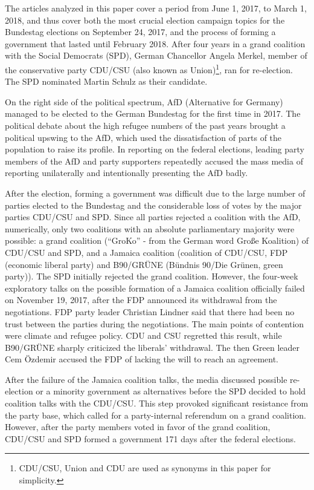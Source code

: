 \documentclass[
  12pt,
]{article}
\begin{document}
The articles analyzed in this paper cover a period from June 1, 2017, to
March 1, 2018, and thus cover both the most crucial election campaign
topics for the Bundestag elections on September 24, 2017, and the
process of forming a government that lasted until February 2018. After
four years in a grand coalition with the Social Democrats (SPD), German
Chancellor Angela Merkel, member of the conservative party CDU/CSU (also
known as Union)\footnote{CDU/CSU, Union and CDU are used as synonyms in
  this paper for simplicity.}, ran for re-election. The SPD nominated
Martin Schulz as their candidate.

On the right side of the political spectrum, AfD (Alternative for
Germany) managed to be elected to the German Bundestag for the first
time in 2017. The political debate about the high refugee numbers of the
past years brought a political upswing to the AfD, which used the
dissatisfaction of parts of the population to raise its profile. In
reporting on the federal elections, leading party members of the AfD and
party supporters repeatedly accused the mass media of reporting
unilaterally and intentionally presenting the AfD badly.

After the election, forming a government was difficult due to the large
number of parties elected to the Bundestag and the considerable loss of
votes by the major parties CDU/CSU and SPD. Since all parties rejected a
coalition with the AfD, numerically, only two coalitions with an
absolute parliamentary majority were possible: a grand coalition
(``GroKo'' - from the German word Große Koalition) of CDU/CSU and SPD,
and a Jamaica coalition (coalition of CDU/CSU, FDP (economic liberal
party) and B90/GRÜNE (Bündnis 90/Die Grünen, green party)). The SPD
initially rejected the grand coalition. However, the four-week
exploratory talks on the possible formation of a Jamaica coalition
officially failed on November 19, 2017, after the FDP announced its
withdrawal from the negotiations. FDP party leader Christian Lindner
said that there had been no trust between the parties during the
negotiations. The main points of contention were climate and refugee
policy. CDU and CSU regretted this result, while B90/GRÜNE sharply
criticized the liberals' withdrawal. The then Green leader Cem Özdemir
accused the FDP of lacking the will to reach an agreement.

After the failure of the Jamaica coalition talks, the media discussed
possible re-election or a minority government as alternatives before the
SPD decided to hold coalition talks with the CDU/CSU. This step provoked
significant resistance from the party base, which called for a
party-internal referendum on a grand coalition. However, after the party
members voted in favor of the grand coalition, CDU/CSU and SPD formed a
government 171 days after the federal elections.
\end{document}
